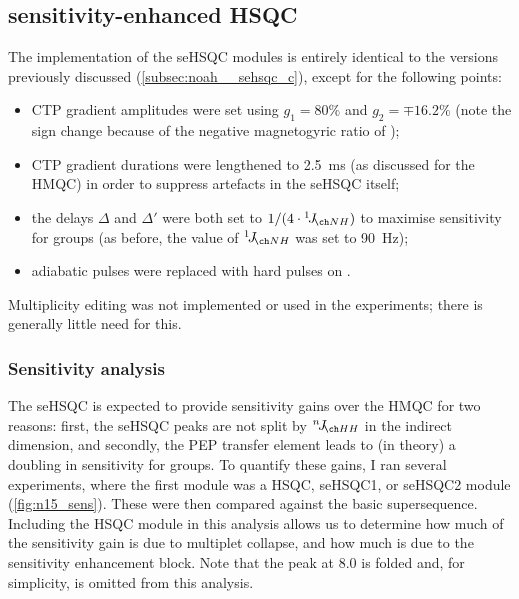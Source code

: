 \subsection{\texorpdfstring{\nitrogen{}}{15N} sensitivity-enhanced HSQC}
\label{subsec:noah__sehsqc_n}

The implementation of the \nitrogen{} seHSQC modules is entirely identical to the \carbon{} versions previously discussed (\cref{subsec:noah__sehsqc_c}), except for the following points:
\begin{itemize}
    \item CTP gradient amplitudes were set using $g_1 = 80\%$ and $g_2 = \mp 16.2\%$ (note the sign change because of the negative magnetogyric ratio of \nitrogen);
    \item CTP gradient durations were lengthened to \qty{2.5}{\ms} (as discussed for the \nitrogen{} HMQC) in order to suppress artefacts in the seHSQC itself;
    \item the delays $\Delta$ and $\Delta'$ were both set to $1/(4 \cdot \oneJ{NH})$ to maximise sensitivity for  groups (as before, the value of $\oneJ{NH}$ was set to \qty{90}{\Hz});
    \item \carbon{} adiabatic pulses were replaced with hard pulses on \nitrogen{}.
\end{itemize}

Multiplicity editing was not implemented or used in the \nitrogen{} experiments; there is generally little need for this.

\subsubsection{Sensitivity analysis}

The seHSQC is expected to provide sensitivity gains over the HMQC for two reasons: first, the seHSQC peaks are not split by $\nJ{HH}$ in the indirect dimension, and secondly, the PEP transfer element leads to (in theory) a doubling in sensitivity for  groups.
To quantify these gains, I ran several  experiments, where the first module was a \nitrogen{} HSQC, seHSQC1, or seHSQC2 module (\cref{fig:n15_sens}).
These were then compared against the basic  supersequence.
Including the \nitrogen{} HSQC module in this analysis allows us to determine how much of the sensitivity gain is due to multiplet collapse, and how much is due to the sensitivity enhancement block.
Note that the peak at \qty{8.0}{\ppm} is folded and, for simplicity, is omitted from this analysis.

